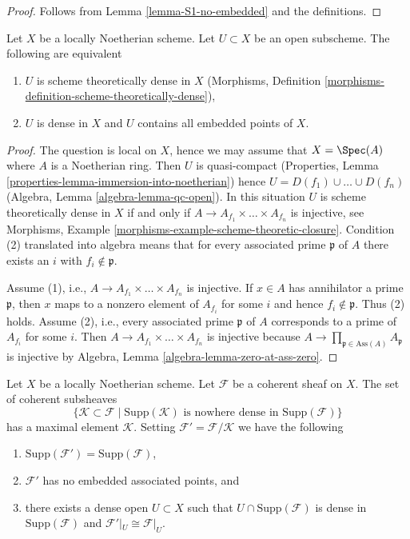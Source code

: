 \begin{proof}
Follows from Lemma \ref{lemma-S1-no-embedded} and the definitions.
\end{proof}

\begin{lemma}
\label{lemma-scheme-theoretically-dense-contain-embedded-points}
Let $X$ be a locally Noetherian scheme. Let $U \subset X$ be an
open subscheme. The following are equivalent
\begin{enumerate}
\item $U$ is scheme theoretically dense in $X$
(Morphisms, Definition \ref{morphisms-definition-scheme-theoretically-dense}),
\item $U$ is dense in $X$ and $U$ contains all embedded points of $X$.
\end{enumerate}
\end{lemma}

\begin{proof}
The question is local on $X$, hence we may assume that $X = \Spec(A)$
where $A$ is a Noetherian ring. Then $U$ is quasi-compact
(Properties, Lemma \ref{properties-lemma-immersion-into-noetherian})
hence $U = D(f_1) \cup \ldots \cup D(f_n)$
(Algebra, Lemma \ref{algebra-lemma-qc-open}).
In this situation $U$ is scheme theoretically dense in $X$ if and only if
$A \to A_{f_1} \times \ldots \times A_{f_n}$ is injective, see
Morphisms, Example \ref{morphisms-example-scheme-theoretic-closure}.
Condition (2) translated into algebra means that for every associated
prime $\mathfrak p$ of $A$ there exists an $i$ with $f_i \not \in \mathfrak p$.

\medskip\noindent
Assume (1), i.e., $A \to A_{f_1} \times \ldots \times A_{f_n}$ is injective.
If $x \in A$ has annihilator a prime $\mathfrak p$, then $x$ maps
to a nonzero element of $A_{f_i}$ for some $i$ and hence
$f_i \not \in \mathfrak p$. Thus (2) holds.
Assume (2), i.e., every associated prime $\mathfrak p$ of $A$
corresponds to a prime of $A_{f_i}$ for some $i$. Then
$A \to A_{f_1} \times \ldots \times A_{f_n}$ is injective because
$A \to \prod_{\mathfrak p \in \text{Ass}(A)} A_\mathfrak p$ is injective
by Algebra, Lemma \ref{algebra-lemma-zero-at-ass-zero}.
\end{proof}

\begin{lemma}
\label{lemma-remove-embedded-points}
Let $X$ be a locally Noetherian scheme.
Let $\mathcal{F}$ be a coherent sheaf on $X$.
The set of coherent subsheaves
$$
\{
\mathcal{K} \subset \mathcal{F}
\mid
\text{Supp}(\mathcal{K})\text{ is nowhere dense in }\text{Supp}(\mathcal{F})
\}
$$
has a maximal element $\mathcal{K}$.
Setting $\mathcal{F}' = \mathcal{F}/\mathcal{K}$ we have the
following
\begin{enumerate}
\item $\text{Supp}(\mathcal{F}') = \text{Supp}(\mathcal{F})$,
\item $\mathcal{F}'$ has no embedded associated points, and
\item there exists a dense open $U \subset X$ such that
$U \cap \text{Supp}(\mathcal{F})$ is dense in $\text{Supp}(\mathcal{F})$
and $\mathcal{F}'|_U \cong \mathcal{F}|_U$.
\end{enumerate}
\end{lemma}

